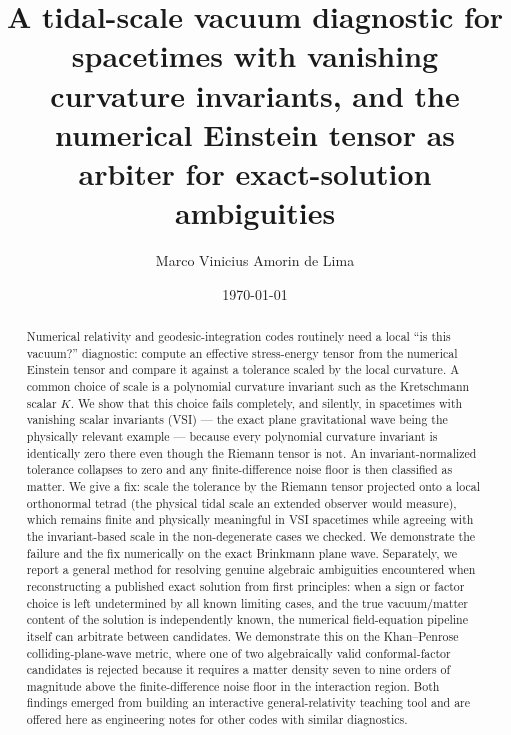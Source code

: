 \documentclass[aps,onecolumn,10pt,nofootinbib]{revtex4-2}
\begin{document}
\title{A tidal-scale vacuum diagnostic for spacetimes with vanishing curvature invariants, and the numerical Einstein tensor as arbiter for exact-solution ambiguities}

\author{Marco Vinicius Amorin de Lima}

\date{\today}

\begin{abstract}
Numerical relativity and geodesic-integration codes routinely need a local
``is this vacuum?'' diagnostic: compute an effective stress-energy tensor
from the numerical Einstein tensor and compare it against a tolerance scaled
by the local curvature. A common choice of scale is a polynomial curvature
invariant such as the Kretschmann scalar $K$. We show that this choice fails
completely, and silently, in spacetimes with vanishing scalar invariants
(VSI) — the exact plane gravitational wave being the physically relevant
example — because every polynomial curvature invariant is identically zero
there even though the Riemann tensor is not. An invariant-normalized
tolerance collapses to zero and any finite-difference noise floor is then
classified as matter. We give a fix: scale the tolerance by the Riemann
tensor projected onto a local orthonormal tetrad (the physical tidal scale
an extended observer would measure), which remains finite and physically
meaningful in VSI spacetimes while agreeing with the invariant-based scale
in the non-degenerate cases we checked. We demonstrate the failure and the
fix numerically on the exact Brinkmann plane wave. Separately, we report a
general method for resolving genuine algebraic ambiguities encountered when
reconstructing a published exact solution from first principles: when a
sign or factor choice is left undetermined by all known limiting cases, and
the true vacuum/matter content of the solution is independently known, the
numerical field-equation pipeline itself can arbitrate between candidates.
We demonstrate this on the Khan--Penrose colliding-plane-wave metric, where
one of two algebraically valid conformal-factor candidates is rejected
because it requires a matter density seven to nine orders of magnitude
above the finite-difference noise floor in the interaction region. Both
findings emerged from building an interactive general-relativity teaching
tool and are offered here as engineering notes for other codes with
similar diagnostics.
\end{abstract}

\maketitle
\end{document}
